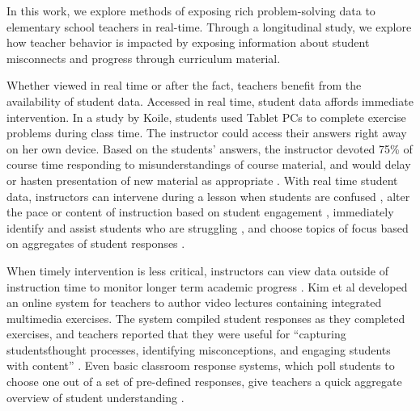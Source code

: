 \documentclass{sigchi}
\begin{document}
In this work, we explore methods of exposing rich problem-solving data to elementary school teachers in real-time. Through a longitudinal study, we explore how teacher behavior is impacted by exposing information about student misconnects and progress through curriculum material.

Whether viewed in real time or after the fact, teachers benefit from the availability of student data. Accessed in real time, student data affords immediate intervention. In a study by Koile, students used Tablet PCs to complete exercise problems during class time. The instructor could access their answers right away on her own device. Based on the students' answers, the instructor devoted 75\% of course time responding to misunderstandings of course material, and would delay or hasten presentation of new material as appropriate \cite{Koile2006}. With real time student data, instructors can intervene during a lesson when students are confused \cite{Hickey2014}, alter the pace or content of instruction based on student engagement \cite{Balaam2010}, immediately identify and assist students who are struggling \cite{Lazar2007}, and choose topics of focus based on aggregates of student responses \cite{Koile2006}.

When timely intervention is less critical, instructors can view data outside of instruction time to
monitor longer term academic progress \cite{Zhang2015, Arnold2012}. Kim et al developed an online system for teachers to author video lectures containing integrated multimedia exercises. The system compiled student responses as they completed exercises, and teachers reported that they were useful for ``capturing students\' thought processes, identifying misconceptions, and engaging students with content'' \cite{Kim2015}. Even basic classroom response systems, which poll students to choose one out of a set of pre-defined responses, give teachers a quick aggregate overview of student understanding \cite{Lazar2007}.
\end{document}
